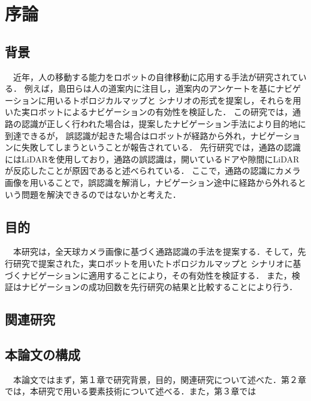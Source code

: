 \documentclass[../main]{subfiles}
\begin{document}
    \setcounter{secnumdepth}{2}
    \chapter{序論}
        \section{背景}
        　近年，人の移動する能力をロボットの自律移動に応用する手法が研究されている．
        例えば，島田らは人の道案内に注目し，道案内のアンケートを基にナビゲーションに用いるトポロジカルマップと
        シナリオの形式を提案し，それらを用いた実ロボットによるナビゲーションの有効性を検証した．
        この研究では，通路の認識が正しく行われた場合は，提案したナビゲーション手法により目的地に到達できるが，
        誤認識が起きた場合はロボットが経路から外れ，ナビゲーションに失敗してしまうということが報告されている．
        先行研究では，通路の認識にはLiDARを使用しており，通路の誤認識は，開いているドアや隙間にLiDARが反応したことが原因であると述べられている．
        ここで，通路の認識にカメラ画像を用いることで，誤認識を解消し，ナビゲーション途中に経路から外れるという問題を解決できるのではないかと考えた．
        \section{目的}
        　本研究は，全天球カメラ画像に基づく通路認識の手法を提案する．そして，先行研究で提案された，実ロボットを用いたトポロジカルマップと
        シナリオに基づくナビゲーションに適用することにより，その有効性を検証する．
        また，検証はナビゲーションの成功回数を先行研究の結果と比較することにより行う．
        \section{関連研究}
        \section{本論文の構成}
        　本論文ではまず，第１章で研究背景，目的，関連研究について述べた．第２章では，本研究で用いる要素技術について述べる．また，第３章では
\end{document}
